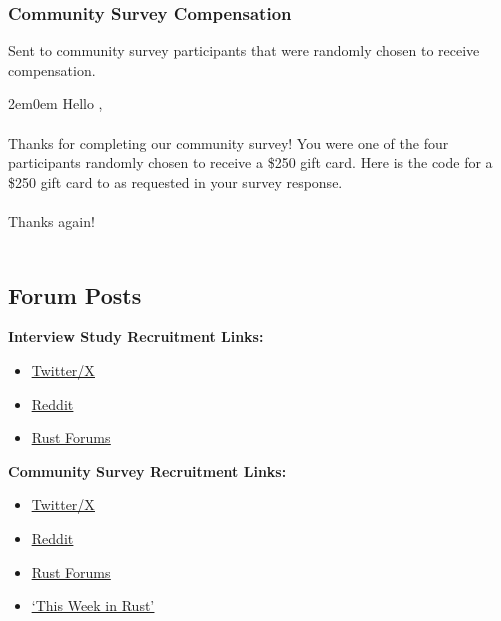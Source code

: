 \subsubsection{Community Survey Compensation}
Sent to community survey participants that were randomly chosen to receive compensation.

\begin{adjustwidth}{2em}{0em}
\noindent Hello ,
\\\\
\noindent Thanks for completing our community survey! You were one of the four participants randomly
chosen to receive a \$250 gift card. Here is the code for a \$250 gift card to  as requested in your survey response.
\\\\
\noindent Thanks again!
\\\\
\end{adjustwidth}


\subsection{Forum Posts}

\noindent\textbf{Interview Study Recruitment Links:}
\begin{itemize}
\item \href{https://x.com/icmccorm/status/1705216472107155594}{\color{blue}\underline{Twitter/X}}
\item \href{https://www.reddit.com/r/rust/comments/134ljk2/calling_unsafe_rust_experts_looking_for_interview/}{\color{blue}\underline{Reddit}}
\item \href{https://users.rust-lang.org/t/calling-unsafe-rust-experts-looking-for-interview-study-participants/93360/2}{\color{blue}\underline{Rust Forums}}
\end{itemize}

\noindent\textbf{Community Survey Recruitment Links:}
\begin{itemize}
\item \href{https://x.com/icmccorm/status/1651633193416630274}{\color{blue}\underline{Twitter/X}}
\item \href{https://www.reddit.com/r/rust/comments/16palsd/we_interviewed_19_rust_developers_who_regularly/}{\color{blue}\underline{Reddit}}
\item \href{https://users.rust-lang.org/t/we-interviewed-19-rust-developers-who-regularly-use-unsafe-now-we-need-your-help-to-evaluate-what-we-learned/100267}{\color{blue}\underline{Rust Forums}}
\item \href{https://this-week-in-rust.org/blog/2023/09/27/this-week-in-rust-514/}{\color{blue}\underline{`This Week in Rust'}}
\end{itemize}

